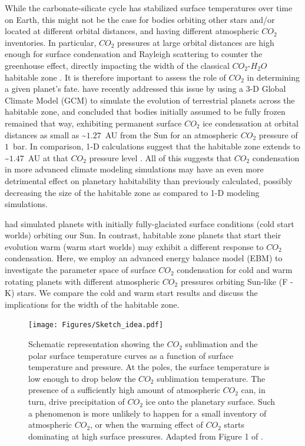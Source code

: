 \documentclass[fleqn,usenatbib]{mnras}
\begin{document}
While the carbonate-silicate cycle has stabilized surface temperatures over time on Earth, this might not be the case for bodies orbiting other stars and/or located at different orbital distances, and having different atmospheric $CO_{\mathrm{2}}$ inventories. In particular, $CO_{\mathrm{2}}$ pressures at large orbital distances are high enough for surface condensation and Rayleigh scattering to counter the greenhouse effect, directly impacting the width of the classical $CO_{\mathrm{2}}$-$H_{\mathrm{2}}O$ habitable zone \citep{kasting1993,KumarKopparapu2013, Ramirez2018}. It is therefore important to assess the role of $CO_{\mathrm{2}}$ in determining a given planet's fate. \citet{Turbet2017} have recently addressed this issue by using a 3-D Global Climate Model (GCM) to simulate the evolution of terrestrial planets across the habitable zone, and concluded that bodies initially assumed to be fully frozen remained that way, exhibiting permanent surface $CO_{\mathrm{2}}$ ice condensation at orbital distances as small as \textasciitilde $1.27$~AU from the Sun for an atmospheric $CO_{\mathrm{2}}$ pressure of $1$~bar. In comparison, 1-D calculations suggest that the habitable zone extends to \textasciitilde $1.47$~AU at that $CO_{\mathrm{2}}$ pressure level \citep{kasting1993,KumarKopparapu2013, Ramirez2018}. 
All of this suggests that $CO_{\mathrm{2}}$ condensation in more advanced climate modeling simulations may have an even more detrimental effect on planetary habitability than previously calculated, possibly decreasing the size of the habitable zone as compared to 1-D modeling simulations.

\citet{Turbet2017} had simulated planets with initially fully-glaciated surface conditions (cold start worlds) orbiting our Sun. In contrast, habitable zone planets that start their evolution warm (warm start worlds) may exhibit a different response to $CO_{\mathrm{2}}$ condensation. Here, we employ an advanced energy balance model (EBM) to investigate the parameter space of surface $CO_{\mathrm{2}}$ condensation for cold and warm rotating planets with different atmospheric $CO_{\mathrm{2}}$ pressures orbiting Sun-like (F - K) stars. We compare the cold and warm start results and discuss the implications for the width of the habitable zone.

\begin{figure}
	\texttt{[image: Figures/Sketch\_idea.pdf]}
    \caption{Schematic representation showing the $CO_{\mathrm{2}}$ sublimation and the polar surface temperature curves as a function of surface temperature and pressure. At the poles, the surface temperature is low enough to drop below the $CO_{\mathrm{2}}$ sublimation temperature. The presence of a sufficiently high amount of atmospheric $CO_{\mathrm{2}}$ can, in turn, drive precipitation of $CO_{\mathrm{2}}$ ice onto the planetary surface. 
    Such a phenomenon is more unlikely to happen for a small inventory of atmospheric $CO_{\mathrm{2}}$, or when the warming effect of $CO_{\mathrm{2}}$ starts dominating at high surface pressures. Adapted from Figure 1 of \citet{Soto2015}.}
    \label{fig:Sketch}
\end{figure}
\end{document}
